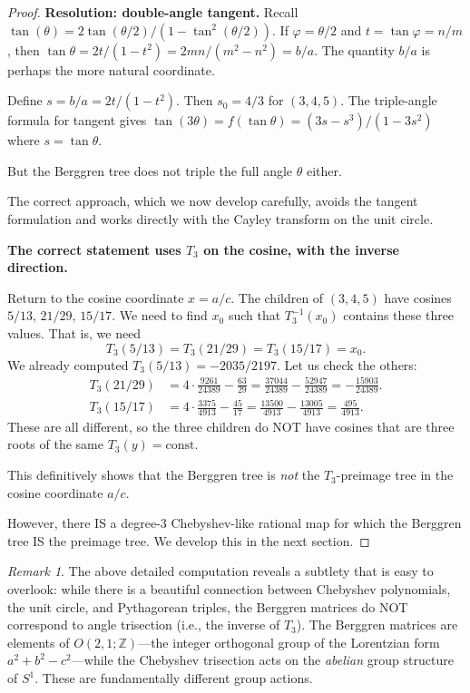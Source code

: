 \documentclass[12pt]{amsart}
\theoremstyle{definition}
\theoremstyle{remark}
\newtheorem{remark}[theorem]{Remark}
\newcommand{\ZZ}{\mathbb{Z}}
\begin{document}
\begin{proof}
\medskip\noindent\textbf{Resolution: double-angle tangent.}
Recall $\tan(\theta) = 2\tan(\theta/2)/(1-\tan^2(\theta/2))$.  If
$\varphi = \theta/2$ and $t = \tan\varphi = n/m$, then
$\tan\theta = 2t/(1-t^2) = 2mn/(m^2-n^2) = b/a$.  The quantity
$b/a$ is perhaps the more natural coordinate.

Define $s = b/a = 2t/(1-t^2)$.  Then $s_0 = 4/3$ for $(3,4,5)$.
The triple-angle formula for tangent gives
$\tan(3\theta) = f(\tan\theta) = (3s-s^3)/(1-3s^2)$
where $s=\tan\theta$.

But the Berggren tree does not triple the full angle $\theta$ either.

\medskip
The correct approach, which we now develop carefully, avoids the tangent
formulation and works directly with the Cayley transform on the unit
circle.

\medskip\noindent\textbf{The correct statement uses $T_3$ on the
cosine, with the inverse direction.}

Return to the cosine coordinate $x = a/c$.  The children of $(3,4,5)$
have cosines $5/13$, $21/29$, $15/17$.  We need to find $x_0$ such that
$T_3^{-1}(x_0)$ contains these three values.  That is, we need
\[
  T_3(5/13) = T_3(21/29) = T_3(15/17) = x_0.
\]
We already computed $T_3(5/13) = -2035/2197$.  Let us check the others:
\begin{align*}
  T_3(21/29)
  &= 4\cdot\frac{9261}{24389} - \frac{63}{29}
   = \frac{37044}{24389} - \frac{52947}{24389}
   = -\frac{15903}{24389}. \\
  T_3(15/17)
  &= 4\cdot\frac{3375}{4913} - \frac{45}{17}
   = \frac{13500}{4913} - \frac{13005}{4913}
   = \frac{495}{4913}.
\end{align*}
These are all different, so the three children do NOT have cosines that
are three roots of the same $T_3(y) = \text{const}$.

This definitively shows that the Berggren tree is \emph{not} the
$T_3$-preimage tree in the cosine coordinate $a/c$.

\medskip
However, there IS a degree-3 Chebyshev-like rational map for which the
Berggren tree IS the preimage tree.  We develop this in the next section.
\end{proof}

\begin{remark}
The above detailed computation reveals a subtlety that is easy to overlook:
while there is a beautiful connection between Chebyshev polynomials, the
unit circle, and Pythagorean triples, the Berggren matrices do NOT
correspond to angle trisection (i.e., the inverse of $T_3$).  The Berggren
matrices are elements of $O(2,1;\ZZ)$---the integer orthogonal group of
the Lorentzian form $a^2+b^2-c^2$---while the Chebyshev trisection acts
on the \emph{abelian} group structure of $S^1$.  These are fundamentally
different group actions.
\end{remark}
\end{document}
